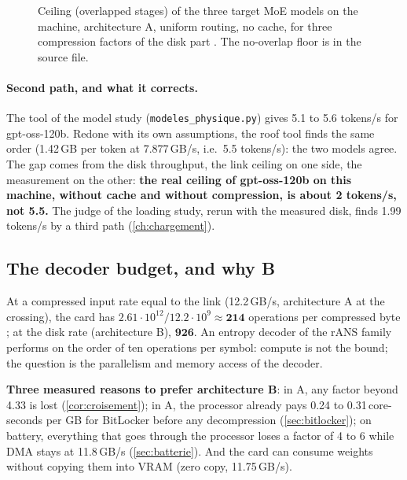 \begin{figure}[ht]
\centering
\GrapheToitPlacements
\caption[The roof of the three target MoE models, real placement]{Ceiling (overlapped stages) of the three target MoE models on the machine, architecture A, uniform routing, no cache, for three compression factors of the disk part \calc. The no-overlap floor is in the source file.}
\label{fig:toit-placements}
\end{figure}

\paragraph{Second path, and what it corrects.} The tool of the model study (\texttt{modeles\_physique.py}) gives 5.1 to 5.6 tokens/s for gpt-oss-120b. Redone with its own assumptions, the roof tool finds the same order (1.42\,GB per token at 7.877\,GB/s, i.e.\ 5.5 tokens/s): the two models agree. The gap comes from the disk throughput, the link ceiling on one side, the measurement on the other: \textbf{the real ceiling of gpt-oss-120b on this machine, without cache and without compression, is about 2 tokens/s, not 5.5.} The judge of the loading study, rerun with the measured disk, finds 1.99 tokens/s by a third path (\cref{ch:chargement}).

\subsection{The decoder budget, and why B}

At a compressed input rate equal to the link (12.2\,GB/s, architecture A at the crossing), the card has $2.61\cdot10^{12} / 12.2\cdot10^{9} \approx \mathbf{214}$ operations per compressed byte \calc; at the disk rate (architecture B), $\mathbf{926}$. An entropy decoder of the rANS family performs on the order of ten operations per symbol: compute is not the bound; the question is the parallelism and memory access of the decoder.

\textbf{Three measured reasons to prefer architecture B}: in A, any factor beyond 4.33 is lost (\cref{cor:croisement}); in A, the processor already pays 0.24 to 0.31\,core-seconds per GB for BitLocker before any decompression (\cref{sec:bitlocker}); on battery, everything that goes through the processor loses a factor of 4 to 6 while DMA stays at 11.8\,GB/s (\cref{sec:batterie}). And the card can consume weights without copying them into VRAM (zero copy, 11.75\,GB/s).

